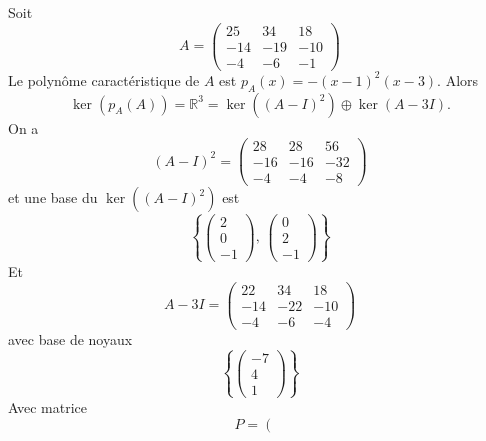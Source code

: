 \begin{example}
\label{exe:60}
  Soit
  \begin{displaymath}
    A = \left(\begin{array}{rrr}
25 & 34 & 18 \\
-14 & -19 & -10 \\
-4 & -6 & -1
\end{array}\right)
\end{displaymath}
%
Le polynôme caractéristique de $A$ est $p_A(x) = -  (x-1)^2 (x-3)$. Alors
\begin{displaymath}
  \ker(p_A(A))  = ℝ^3 = \ker\left((A - I)^2\right) ⊕  \ker(A - 3I). 
\end{displaymath}
On a
\begin{displaymath}
(A - I)^2 =   \left(\begin{array}{rrr}
28 & 28 & 56 \\
-16 & -16 & -32 \\
-4 & -4 & -8
\end{array}\right)
\end{displaymath}
et une base du $\ker\left((A - I)^2\right)$ est
\begin{displaymath}
  \left\{
    \begin{pmatrix}
      2\\0\\-1
    \end{pmatrix}, \,
    \begin{pmatrix}
      0\\2\\ -1
    \end{pmatrix}
\right\} 
\end{displaymath}
Et
\begin{displaymath}
A - 3I =   \left(\begin{array}{rrr}
22 & 34 & 18 \\
-14 & -22 & -10 \\
-4 & -6 & -4
                 \end{array}\right)               
\end{displaymath}
avec base de noyaux
\begin{displaymath}
  \left\{
    \begin{pmatrix}
      -7 \\ 4 \\ 1
    \end{pmatrix} \right\} 
\end{displaymath}
Avec matrice
\begin{displaymath}
  P = \left(\begin{array}{rrr}

\end{array}
\end{displaymath}
\end{example}
